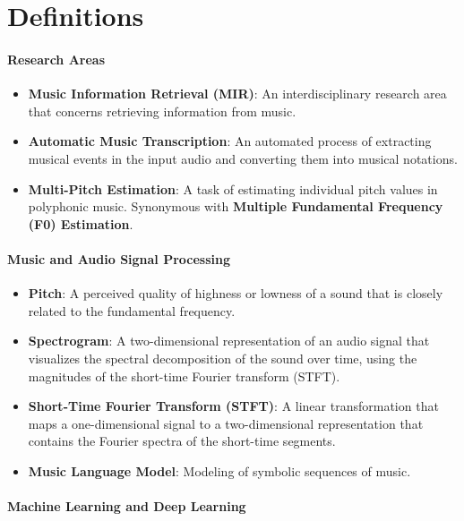 \section{Definitions}\label{sec:definitions}

\paragraph{Research Areas}

\begin{itemize}
	\item \textbf{Music Information Retrieval (MIR)}: An interdisciplinary research area that concerns retrieving information from music.
	\item \textbf{Automatic Music Transcription}: An automated process of extracting musical events in the input audio and converting them into musical notations.
	\item \textbf{Multi-Pitch Estimation}: A task of estimating individual pitch values in polyphonic music. Synonymous with \textbf{Multiple Fundamental Frequency (F0) Estimation}.
\end{itemize}

\noindent 
\paragraph{Music and Audio Signal Processing}

\begin{itemize}
	\item \textbf{Pitch}: A perceived quality of highness or lowness of a sound that is closely related to the fundamental frequency.
	\item \textbf{Spectrogram}: A two-dimensional representation of an audio signal that visualizes the spectral decomposition of the sound over time, using the magnitudes of the short-time Fourier transform (STFT).
	\item \textbf{Short-Time Fourier Transform (STFT)}: A linear transformation that maps a one-dimensional signal to a two-dimensional representation that contains the Fourier spectra of the short-time segments.
	\item \textbf{Music Language Model}: Modeling of symbolic sequences of music.
\end{itemize}

\paragraph{Machine Learning and Deep Learning}

